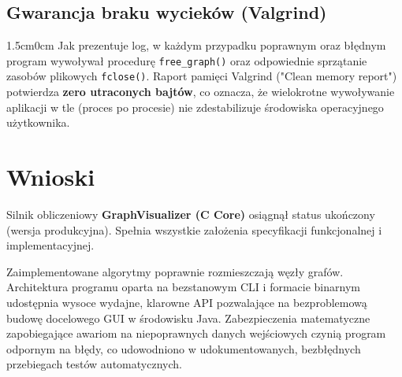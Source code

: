 \documentclass[12pt,a4paper]{article}
\begin{document}
\noindent
\begin{minipage}{\textwidth}
\subsection{Gwarancja braku wycieków (Valgrind)}
\begin{adjustwidth}{1.5cm}{0cm}
Jak prezentuje log, w każdym przypadku poprawnym oraz błędnym program wywoływał procedurę \texttt{free\_graph()} oraz odpowiednie sprzątanie zasobów plikowych \texttt{fclose()}. Raport pamięci Valgrind ("Clean memory report") potwierdza \textbf{zero utraconych bajtów}, co oznacza, że wielokrotne wywoływanie aplikacji w tle (proces po procesie) nie zdestabilizuje środowiska operacyjnego użytkownika.
\end{adjustwidth}
\end{minipage}
\vspace{0.5cm}

\section{Wnioski}
Silnik obliczeniowy \textbf{GraphVisualizer (C Core)} osiągnął status ukończony (wersja produkcyjna). Spełnia wszystkie założenia specyfikacji funkcjonalnej i implementacyjnej.

Zaimplementowane algorytmy poprawnie rozmieszczają węzły grafów. Architektura programu oparta na bezstanowym CLI i formacie binarnym udostępnia wysoce wydajne, klarowne API pozwalające na bezproblemową budowę docelowego GUI w środowisku Java. Zabezpieczenia matematyczne zapobiegające awariom na niepoprawnych danych wejściowych czynią program odpornym na błędy, co udowodniono w udokumentowanych, bezbłędnych przebiegach testów automatycznych.
\end{document}
